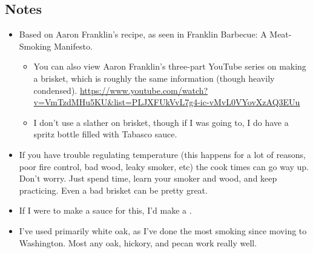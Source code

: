 \begin{multicols}{2}
\subsection*{Notes}
\begin{itemize}
    \item Based on Aaron Franklin's recipe, as seen in Franklin Barbecue: A Meat-Smoking Manifesto.
    \begin{itemize}
        \item You can also view Aaron Franklin's three-part YouTube series on making a brisket, which is roughly the same information (though heavily condensed). \url{https://www.youtube.com/watch?v=VmTzdMHu5KU&list=PLJXFUkVvL7g4-ic-vMvL0VYovXzAQ3EUu}
        \item I don't use a slather on brisket, though if I was going to, I do have a spritz bottle filled with Tabasco sauce.
    \end{itemize}
    \item If you have trouble regulating temperature (this happens for a lot of reasons, poor fire control, bad wood, leaky smoker, etc) the cook times can go way up. Don't worry. Just spend time, learn your smoker and wood, and keep practicing. Even a bad brisket can be pretty great.
    \item If I were to make a sauce for this, I'd make a .
    \item I've used primarily white oak, as I've done the most smoking since moving to Washington. Most any oak, hickory, and pecan work really well.
\end{itemize}
\end{multicols}
\clearpage